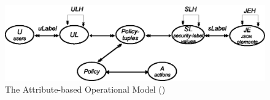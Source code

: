  
 	\begin{figure}[t]
 		\centering
 		\includegraphics[width=.9\textwidth]{NSS16/operational-model}
 		\caption{ The Attribute-based Operational Model (\atom{})}
 		\label{fig:operational-model}
 	\end{figure}
 